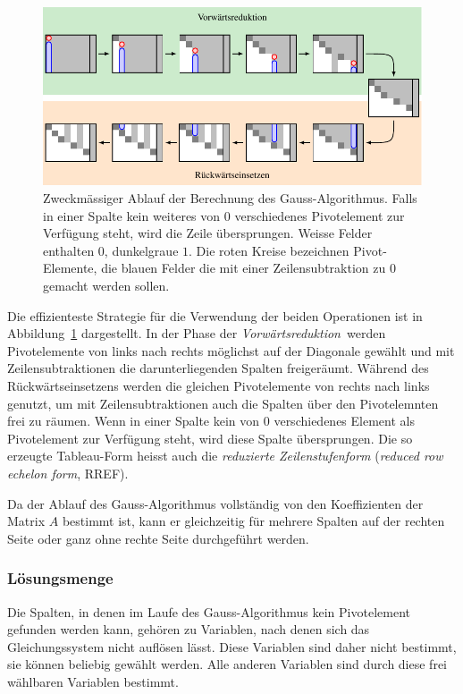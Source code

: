 \begin{figure}
\centering
\includegraphics[width=\textwidth]{chapters/10-vektorenmatrizen/images/rref.pdf}
\caption{Zweckmässiger Ablauf der Berechnung des Gauss-Algorithmus.
Falls in einer Spalte kein weiteres von $0$ verschiedenes Pivotelement
zur Verfügung steht, wird die Zeile übersprungen.
Weisse Felder enthalten $0$, dunkelgraue $1$.
Die roten Kreise bezeichnen Pivot-Elemente, die blauen Felder
die mit einer Zeilensubtraktion zu $0$ gemacht werden sollen.
\label{buch:grundlagen:fig:gaussalgorithmus}}
\end{figure}
Die effizienteste Strategie für die Verwendung der beiden Operationen
ist in Abbildung~\ref{buch:grundlagen:fig:gaussalgorithmus} dargestellt.
In der Phase der {\em Vorwärtsreduktion} werden Pivotelemente von links
nach rechts möglichst auf der Diagonale gewählt und mit Zeilensubtraktionen
die darunterliegenden Spalten freigeräumt.
%
Während des Rückwärtseinsetzens werden die gleichen Pivotelemente von
rechts nach links genutzt, um mit Zeilensubtraktionen auch die
Spalten über den Pivotelemnten frei zu räumen.
%
Wenn in einer Spalte kein von $0$ verschiedenes Element als Pivotelement
zur Verfügung steht, wird diese Spalte übersprungen.
Die so erzeugte Tableau-Form heisst auch die {\em reduzierte Zeilenstufenform}
({\em reduced row echelon form}, RREF).
%
%

Da der Ablauf des Gauss-Algorithmus vollständig von den Koeffizienten der
Matrix $A$ bestimmt ist, kann er gleichzeitig für mehrere Spalten auf der
rechten Seite oder ganz ohne rechte Seite durchgeführt werden.

\subsubsection{Lösungsmenge}
%
Die Spalten, in denen im Laufe des Gauss-Algorithmus kein Pivotelement
gefunden werden kann, gehören zu Variablen, nach denen sich das
Gleichungssystem nicht auflösen lässt.
Diese Variablen sind daher nicht bestimmt, sie können beliebig gewählt
werden.
Alle anderen Variablen sind durch diese frei wählbaren Variablen
bestimmt.

